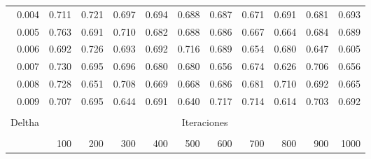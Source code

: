\begin{table}[h]
\begin{tabular}{rrrrrrrrrrr}
0.004                      & 0.711                & 0.721                & 0.697                & 0.694                & 0.688                & 0.687                & 0.671                & 0.691                & 0.681                & 0.693                \\
0.005                      & 0.763                & 0.691                & 0.710                & 0.682                & 0.688                & 0.686                & 0.667                & 0.664                & 0.684                & 0.689                \\
0.006                      & 0.692                & 0.726                & 0.693                & 0.692                & 0.716                & 0.689                & 0.654                & 0.680                & 0.647                & 0.605                \\
0.007                      & 0.730                & 0.695                & 0.696                & 0.680                & 0.680                & 0.656                & 0.674                & 0.626                & 0.706                & 0.656                \\
0.008                      & 0.728                & 0.651                & 0.708                & 0.669                & 0.668                & 0.686                & 0.681                & 0.710                & 0.692                & 0.665                \\
0.009                      & 0.707                & 0.695                & 0.644                & 0.691                & 0.640                & 0.717                & 0.714                & 0.614                & 0.703                & 0.692                \\ \hline
\multicolumn{1}{l}{}       & \multicolumn{1}{l}{} & \multicolumn{1}{l}{} & \multicolumn{1}{l}{} & \multicolumn{1}{l}{} & \multicolumn{1}{l}{} & \multicolumn{1}{l}{} & \multicolumn{1}{l}{} & \multicolumn{1}{l}{} & \multicolumn{1}{l}{} & \multicolumn{1}{l}{} \\
\multicolumn{1}{l}{Deltha} & \multicolumn{10}{c}{Iteraciones}    \\ \hline                                                                                                                                                                                                  \\
\multicolumn{1}{l}{}       & 100                  & 200                  & 300                  & 400                  & 500                  & 600                  & 700                  & 800                  & 900                  & 1000                 \\

\end{tabular}
\end{table}
